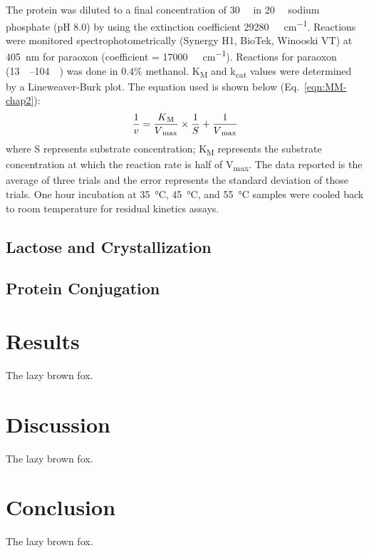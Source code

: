\begin{refsection}
The protein was diluted to a final concentration of \SI{30}{\nano\Molar} in
\SI{20}{\milli\Molar} sodium phosphate (pH 8.0) by using the extinction
coefficient \SI{29280}{\per\Molar\per\cm}. Reactions were monitored
spectrophotometrically (Synergy H1, BioTek, Winooski VT) at \SI{405}{\nm} for
paraoxon (coefficient = \SI{17000}{\per\Molar\per\cm}).  Reactions for paraoxon
(\SIrange{13}{104}{\micro\Molar}) was done in 0.4\% methanol.
K\textsubscript{M} and k\textsubscript{cat} values were determined by a
Lineweaver-Burk plot.\cite{Baker2011b} The equation used is shown below
(Eq.~\ref{eqn:MM-chap2}): 
\begin{equation} 
    \frac{1}{v} =
    \frac{K\textsubscript{M}}{V\textsubscript{max}}\times\frac{1}{S} +
    \frac{1}{V\textsubscript{max}} 
    \label{eqn:MM-chap2}
\end{equation}
where S represents substrate concentration; K\textsubscript{M} represents the
substrate concentration at which the reaction rate is half of
V\textsubscript{max}. The data reported is the average of three trials and the
error represents the standard deviation of those trials. One hour incubation at
\SI{35}{\celsius}, \SI{45}{\celsius}, and \SI{55}{\celsius} samples were cooled
back to room temperature for residual kinetics assays. 

\subsection{Lactose and Crystallization}

\subsection{Protein Conjugation}

\section{Results}

The lazy brown fox.

\section{Discussion}

The lazy brown fox.

\section{Conclusion}

The lazy brown fox.

\printbibliography[heading=subbibliography]

\end{refsection}
